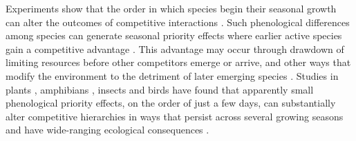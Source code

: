 \documentclass{article}[12pt]
\begin{document}
Experiments show that the order in which species begin their seasonal growth can alter the outcomes of competitive interactions \citep{Dawson-Glass:2025,Buonaiuto:2023wy}. Such phenological differences among species can generate seasonal priority effects where earlier active species gain a competitive advantage \citep{wolkovich2021phenological,levine2022competition}. This advantage may occur through drawdown of limiting resources before other competitors emerge or arrive, and other ways that modify the environment to the detriment of later emerging species \citep{Fukami2015,Weidlich:2020aa}. Studies in plants \citep{Wainwright_2011,Korner2008}, amphibians \citep{Rudolf:2013tg}, insects \citep{Ekholm2020,Rasmussen2014} and birds \citep{Samplonius:2019wo} have found that apparently small phenological priority effects, on the order of just a few days, can substantially alter competitive hierarchies in ways that persist across several growing seasons \citep{Vaughn:2015wp} and have wide-ranging ecological consequences \citep{Nakazawa:2012aa}. 
\end{document}
